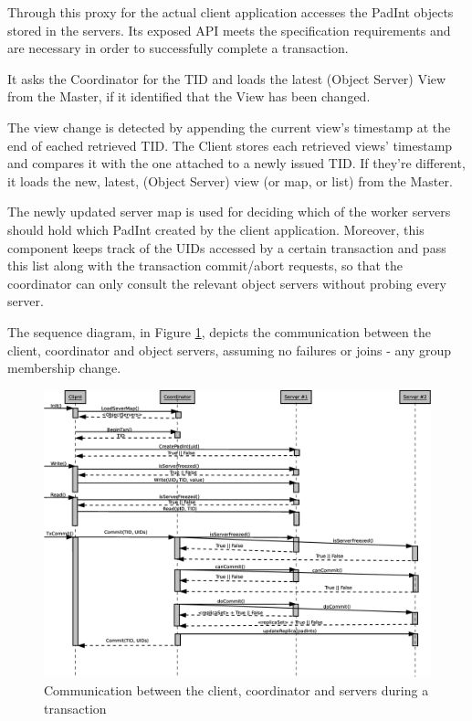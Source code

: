 \documentclass[times, 10pt,twocolumn]{article}
\begin{document}
\label{subsec:client}
Through this proxy for the actual client application accesses the PadInt objects stored in the servers. 
Its exposed API meets the specification requirements and are necessary in order to 
successfully complete a transaction. 
 
It asks the Coordinator for the TID and loads the latest (Object Server) View from the Master,
 if it identified that the View has been changed.

The view change is detected by appending the current view's timestamp at the end of eached retrieved TID. 
The Client stores each retrieved views' timestamp and compares it with the one attached to a newly issued TID. 
If they're different, it loads the new, latest, (Object Server) view (or map, or list) from the Master. 

The newly updated server map is used for deciding which of the worker servers should hold which PadInt created 
by the client application. 
Moreover, this component keeps track of the UIDs accessed by a certain transaction and pass this list along
 with the transaction commit/abort requests, so that the coordinator can only consult the relevant object servers
 without probing every server.


\label{sec:algor}
The sequence diagram, in Figure \ref{fig:seqd}, depicts the communication between the client, coordinator and object servers,
assuming no failures or joins - any group membership change. 

\begin{figure}
\centering
\includegraphics[scale=0.25]{seqDiaCommSteps.eps}
\caption{Communication between the client, coordinator and servers during a transaction}
\label{fig:seqd}
\end{figure}
\end{document}
